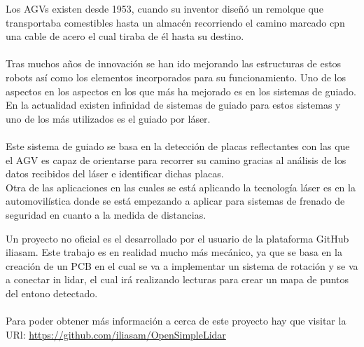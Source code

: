 
Los AGVs existen desde 1953, cuando su inventor diseñó un remolque que transportaba comestibles hasta un almacén recorriendo el camino marcado cpn una cable de acero el cual tiraba de él hasta su destino.\\
\\
Tras muchos años de innovación se han ido mejorando las estructuras de estos robots así como los elementos incorporados para su funcionamiento. Uno de los aspectos en los aspectos en los que más ha mejorado es en los sistemas de guiado. En la actualidad existen infinidad de sistemas de guiado para estos sistemas y uno de los más utilizados es el guiado por láser.\\
\\
Este sistema de guiado se basa en la detección de placas reflectantes con las que el AGV es capaz de orientarse para recorrer su camino gracias al análisis de los datos recibidos del láser e identificar dichas placas.\\
Otra de las aplicaciones en las cuales se está aplicando la tecnología láser es en la automovilística donde se está empezando a aplicar para sistemas de frenado de seguridad en cuanto a la medida de distancias.\\

Un proyecto no oficial es el desarrollado por el usuario de la plataforma GitHub iliasam. Este trabajo es en realidad mucho más mecánico, ya que se basa en la creación de un PCB en el cual se va a implementar un sistema de rotación y se va a conectar in lidar, el cual irá realizando lecturas para crear un mapa de puntos del entono detectado.\\
\\
Para poder obtener más información a cerca de este proyecto hay que visitar la URl: \url{https://github.com/iliasam/OpenSimpleLidar}
